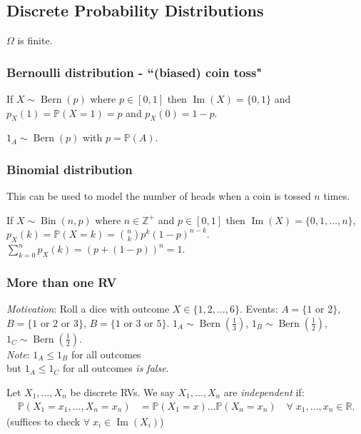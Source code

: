 \subsection{Discrete Probability Distributions}
$\Omega$ is finite.

\subsubsection{Bernoulli distribution - ``(biased) coin toss"}

If $X \sim \operatorname{Bern}(p)$ where $p \in [0, 1]$ then $\operatorname{Im}(X) = \{0, 1\}$ and $p_X(1) = \mathbb{P}(X = 1) = p$ and $p_X(0) = 1 - p$.

\begin{example}
    $1_A \sim \operatorname{Bern}(p)$ with $p = \mathbb{P}(A)$.
\end{example} 

\subsubsection{Binomial distribution}
This can be used to model the number of heads when a coin is tossed $n$ times.

If $X \sim \operatorname{Bin}(n, p)$ where $n \in \mathbb{Z}^+$ and $p \in [0, 1]$ then $\operatorname{Im}(X) = \{0, 1, \dots, n\}$, $p_X(k) = \mathbb{P}(X = k) = \binom{n}{k} p^k (1- p)^{n -k}$.
$\sum_{k=0}^{n} p_X(k) = (p + (1-p))^n = 1$.

\subsubsection{More than one RV}

\emph{Motivation}: Roll a dice with outcome $X \in \{1, 2, \dots, 6\}$.
Events: $A = \{1 \text{ or } 2\}$, $B = \{1 \text{ or } 2 \text{ or } 3\}$, $B = \{1 \text{ or } 3 \text{ or } 5\}$.
$1_A \sim \operatorname{Bern}\left(\frac{1}{3}\right)$, $1_B \sim \operatorname{Bern}\left(\frac{1}{2}\right)$, $1_C \sim \operatorname{Bern}\left(\frac{1}{2}\right)$.\\
\emph{Note}: $1_A \leq 1_B$ for all outcomes \\
but $1_A \leq 1_C$ for all outcomes \emph{is false}.

\begin{definition}
    Let $X_1, \dots, X_n$ be discrete RVs.
    We say $X_1, \dots, X_n$ are \emph{independent} if:
    \begin{align*}
        \mathbb{P}(X_1 = x_1, \dots, X_n = x_n) &= \mathbb{P}(X_1 = x) \dots \mathbb{P}(X_n = x_n) \quad \forall \; x_1, \dots, x_n \in \mathbb{R}.
    \end{align*} 
    \color{blue} (suffices to check $\forall \; x_i \in \operatorname{Im}(X_i)$)
\end{definition} 

